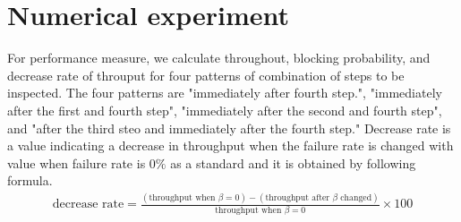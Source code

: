 %

\section{Numerical experiment \label{sec:compute2}}
For performance measure, we calculate throughout, blocking probability, and decrease rate of throuput for four patterns of combination of steps to be inspected.
The four patterns are "immediately after fourth step.", "immediately after the first and fourth step", "immediately after the second and fourth step", and "after the third steo and immediately after the fourth step."
Decrease rate is a value indicating a decrease in throughput when the failure rate is changed with value when failure rate is $0\%$ as a standard and it is obtained by following formula.
\begin{eqnarray*}
\mbox{decrease rate} = \frac{(\mbox{throughput when $\beta=0$})-(\mbox{throughput after $\beta$ changed})}{\mbox{throughput when $\beta=0$}} \times 100
\end{eqnarray*}

